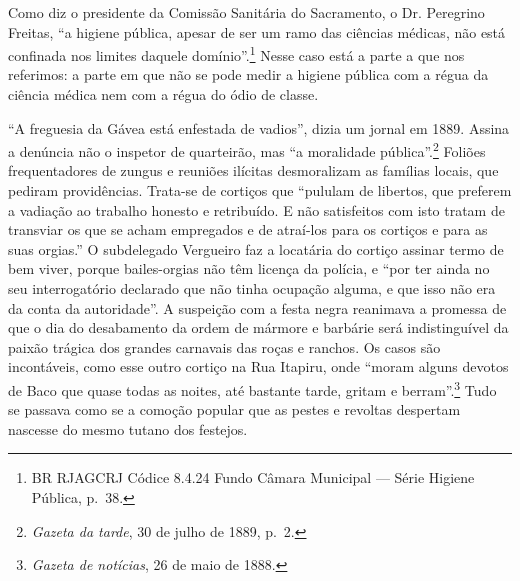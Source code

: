Como diz o presidente da Comissão Sanitária do Sacramento, o Dr.
Peregrino Freitas, ``a higiene pública, apesar de ser um ramo das
ciências médicas, não está confinada nos limites daquele
domínio''.\footnote{BR RJAGCRJ Códice 8.4.24 Fundo Câmara Municipal ---
  Série Higiene Pública, p.~38.} Nesse caso está a parte a que nos
referimos: a parte em que não se pode medir a higiene pública com a
régua da ciência médica nem com a régua do ódio de classe.

``A freguesia da Gávea está enfestada de vadios'', dizia um jornal em
1889. Assina a denúncia não o inspetor de quarteirão, mas ``a moralidade
pública''.\footnote{\textit{Gazeta da tarde}, 30 de julho de 1889, p.~2.}
Foliões frequentadores de zungus e reuniões ilícitas desmoralizam as
famílias locais, que pediram providências. Trata-se de cortiços que
``pululam de libertos, que preferem a vadiação ao trabalho honesto e
retribuído. E não satisfeitos com isto tratam de transviar os que se
acham empregados e de atraí-los para os cortiços e para as suas
orgias.'' O subdelegado Vergueiro faz a locatária do cortiço assinar
termo de bem viver, porque bailes-orgias não têm licença da polícia, e
``por ter ainda no seu interrogatório declarado que não tinha ocupação
alguma, e que isso não era da conta da autoridade''. A suspeição com a
festa negra reanimava a promessa de que o dia do desabamento da ordem de
mármore e barbárie será indistinguível da paixão trágica dos grandes
carnavais das roças e ranchos. Os casos são incontáveis, como esse outro
cortiço na Rua Itapiru, onde ``moram alguns devotos de Baco que quase
todas as noites, até bastante tarde, gritam e berram''.\footnote{\textit{Gazeta
  de notícias}, 26 de maio de 1888.} Tudo se passava como se a comoção
popular que as pestes e revoltas despertam nascesse do mesmo tutano dos
festejos.

